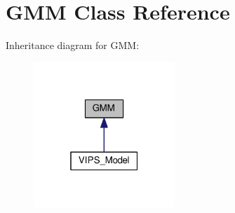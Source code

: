 \hypertarget{classGMM}{}\section{G\+MM Class Reference}
\label{classGMM}


Inheritance diagram for G\+MM\+:\nopagebreak
\begin{figure}[H]
\begin{center}
\leavevmode
\includegraphics[width=151pt]{classGMM__inherit__graph}
\end{center}
\end{figure}
